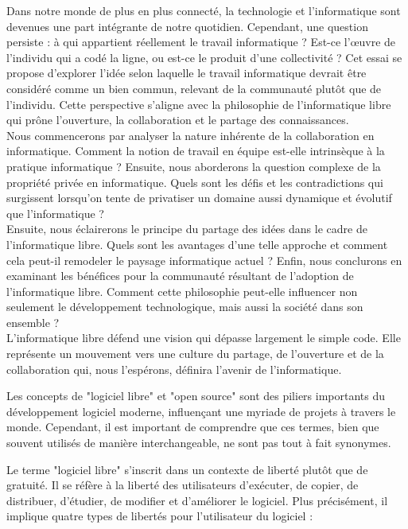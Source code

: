 Dans notre monde de plus en plus connecté, la technologie et l'informatique sont devenues une part intégrante de notre quotidien. Cependant, une question persiste : à qui appartient réellement le travail informatique ? Est-ce l'œuvre de l'individu qui a codé la ligne, ou est-ce le produit d'une collectivité ? Cet essai se propose d'explorer l'idée selon laquelle le travail informatique devrait être considéré comme un bien commun, relevant de la communauté plutôt que de l'individu. Cette perspective s'aligne avec la philosophie de l'informatique libre qui prône l'ouverture, la collaboration et le partage des connaissances.\\

Nous commencerons par analyser la nature inhérente de la collaboration en informatique. Comment la notion de travail en équipe est-elle intrinsèque à la pratique informatique ? Ensuite, nous aborderons la question complexe de la propriété privée en informatique. Quels sont les défis et les contradictions qui surgissent lorsqu'on tente de privatiser un domaine aussi dynamique et évolutif que l'informatique ?\\

Ensuite, nous éclairerons le principe du partage des idées dans le cadre de l'informatique libre. Quels sont les avantages d'une telle approche et comment cela peut-il remodeler le paysage informatique actuel ? Enfin, nous conclurons en examinant les bénéfices pour la communauté résultant de l'adoption de l'informatique libre. Comment cette philosophie peut-elle influencer non seulement le développement technologique, mais aussi la société dans son ensemble ?\\

L'informatique libre défend une vision qui dépasse largement le simple code. Elle représente un mouvement vers une culture du partage, de l'ouverture et de la collaboration qui, nous l'espérons, définira l'avenir de l'informatique.

Les concepts de "logiciel libre" et "open source" sont des piliers importants du développement logiciel moderne, influençant une myriade de projets à travers le monde. Cependant, il est important de comprendre que ces termes, bien que souvent utilisés de manière interchangeable, ne sont pas tout à fait synonymes.

Le terme "logiciel libre" s'inscrit dans un contexte de liberté plutôt que de gratuité. Il se réfère à la liberté des utilisateurs d'exécuter, de copier, de distribuer, d'étudier, de modifier et d'améliorer le logiciel. Plus précisément, il implique quatre types de libertés pour l'utilisateur du logiciel :

